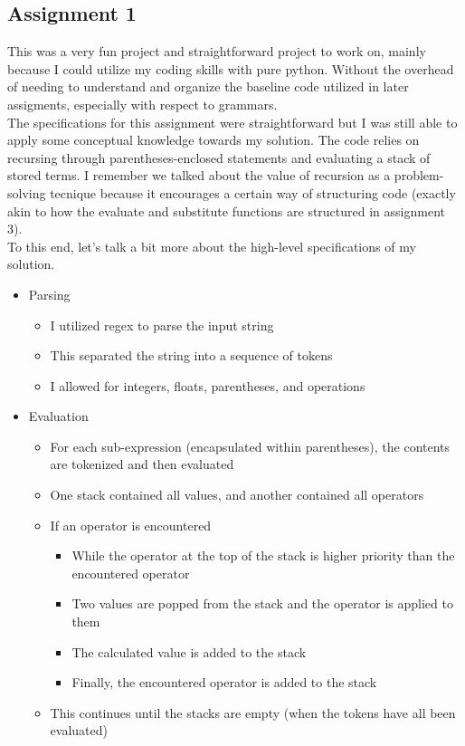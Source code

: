 \documentclass{article}
\theoremstyle{theorem}
\theoremstyle{definition}
\theoremstyle{remark}
\begin{document}
\subsection{Assignment 1}
This was a very fun project and straightforward project to work on, mainly because I could utilize my coding skills with pure python. Without the overhead of needing to understand and organize the baseline code utilized in later assigments, especially with respect to grammars.\\

The specifications for this assignment were straightforward but I was still able to apply some conceptual knowledge towards my solution. The code relies on recursing through parentheses-enclosed statements and evaluating a stack of stored terms. I remember we talked about the value of recursion as a problem-solving tecnique because it encourages a certain way of structuring code (exactly akin to how the evaluate and substitute functions are structured in assignment 3).\\

To this end, let's talk a bit more about the high-level specifications of my solution.
\begin{itemize}
  \item Parsing
    \begin{itemize}
    \item I utilized regex to parse the input string
    \item This separated the string into a sequence of tokens
    \item I allowed for integers, floats, parentheses, and operations
    \end{itemize}
  \item Evaluation
    \begin{itemize}
      \item For each sub-expression (encapsulated within parentheses), the contents are tokenized and then evaluated
      \item One stack contained all values, and another contained all operators
      \item If an operator is encountered
        \begin{itemize}
          \item While the operator at the top of the stack is higher priority than the encountered operator
          \item Two values are popped from the stack and the operator is applied to them
          \item The calculated value is added to the stack
          \item Finally, the encountered operator is added to the stack
        \end{itemize}
      \item This continues until the stacks are empty (when the tokens have all been evaluated)
    \end{itemize}
\end{itemize}
\end{document}
